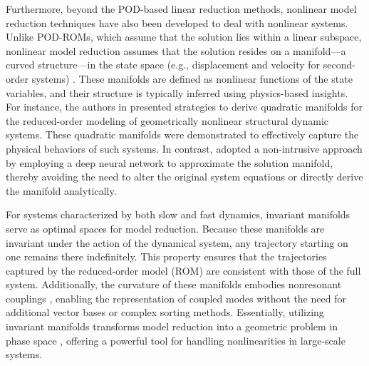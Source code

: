\documentclass[11pt]{article}
\begin{document}
Furthermore, beyond the POD-based linear reduction methods, nonlinear model reduction techniques \cite{Amsallem_2012,hahn2002improved,dong2003piecewise,carlberg2013gnat,carlberg2015preserving,chaturantabut2012state,rowley2017model,daronch2012nonlinear} have also been developed to deal with nonlinear systems.
Unlike POD-ROMs, which assume that the solution lies within a linear subspace, nonlinear model reduction \cite{Touz__2021,shaw1991non-linear,Chen_1996,daniel2022physics,borggaard2016goal} assumes that the solution resides on a manifold—a curved structure—in the state space (e.g., displacement and velocity for second-order systems) \cite{glad2018control,trentelman2002control}.
These manifolds are defined as nonlinear functions of the state variables, and their structure is typically inferred using physics-based insights.
For instance, the authors in \cite{Rutzmoser_2017,jain2017quadratic} presented strategies to derive quadratic manifolds for the reduced-order modeling of geometrically nonlinear structural dynamic systems.
These quadratic manifolds were demonstrated to effectively capture the physical behaviors of such systems.
In contrast, \cite{kim2022fast} adopted a non-intrusive approach by employing a deep neural network to approximate the solution manifold, thereby avoiding the need to alter the original system equations or directly derive the manifold analytically.


For systems characterized by both slow and fast dynamics, invariant manifolds \cite{gorban2004constructive,cabre2005parameterization,shaw1991non-linear,simo1989analytical,guckenheimer2004fast,ascher1994stabilization} serve as optimal spaces for model reduction.
Because these manifolds are invariant under the action of the dynamical system, any trajectory starting on one remains there indefinitely.
This property ensures that the trajectories captured by the reduced-order model (ROM) are consistent with those of the full system.
Additionally, the curvature of these manifolds embodies nonresonant couplings \cite{shami2022nonlinear,Touz__2021,Lacarbonara_2003}, enabling the representation of coupled modes without the need for additional vector bases or complex sorting methods.
Essentially, utilizing invariant manifolds transforms model reduction into a geometric problem in phase space \cite{nolte2010tangled,cenedese2022data}, offering a powerful tool for handling nonlinearities in large-scale systems.
\end{document}

